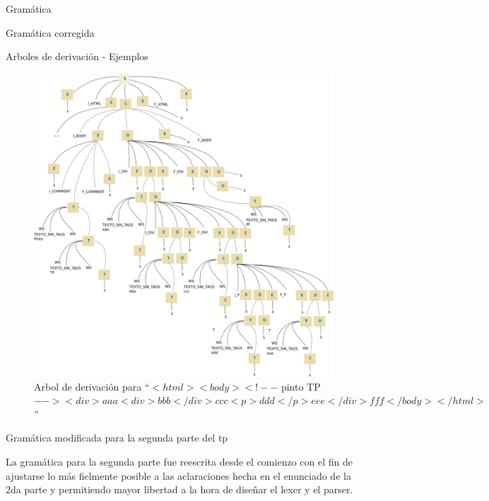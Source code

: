 \documentclass[a4paper,8pt]{article}
\begin{document}
\begin{section}{Gramática}
\begin{subsection}{Gramática corregida}
\begin{subsubsection}{Arboles de derivación - Ejemplos}
    \begin{figure}[h!]
      \centering
      \includegraphics[scale=0.35]{g5188.jpg}

      \caption{Arbol de derivación para ``$<html> <body><!--$ pinto TP $--> <div>aaa<div>bbb</div>ccc<p>ddd</p>eee</div>fff</body></html>$''}
    \end{figure}


 \end{subsubsection}

\end{subsection}
\newpage

\begin{subsection}{Gramática modificada para la segunda parte del tp}

La gramática para la segunda parte fue reescrita desde el comienzo con el fin de ajustarse lo más fielmente posible a las aclaraciones hecha en el enunciado de la 2da parte y permitiendo mayor libertad a la hora de diseñar el lexer y el parser.\\


\end{subsection}
\end{section}
\end{document}
